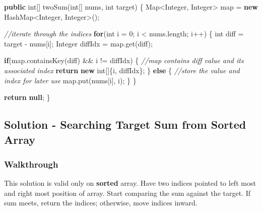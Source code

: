 \documentclass[]{book}
\newenvironment{Shaded}{\begin{snugshade}}{\end{snugshade}}
\newcommand{\BuiltInTok}[1]{#1}
\newcommand{\CommentTok}[1]{\textcolor[rgb]{0.56,0.35,0.01}{\textit{#1}}}
\newcommand{\DataTypeTok}[1]{\textcolor[rgb]{0.13,0.29,0.53}{#1}}
\newcommand{\DecValTok}[1]{\textcolor[rgb]{0.00,0.00,0.81}{#1}}
\newcommand{\FunctionTok}[1]{\textcolor[rgb]{0.00,0.00,0.00}{#1}}
\newcommand{\KeywordTok}[1]{\textcolor[rgb]{0.13,0.29,0.53}{\textbf{#1}}}
\newcommand{\NormalTok}[1]{#1}
\begin{document}
\begin{Shaded}
\begin{Highlighting}[]
\KeywordTok{public} \DataTypeTok{int}\NormalTok{[] }\FunctionTok{twoSum}\NormalTok{(}\DataTypeTok{int}\NormalTok{[] nums, }\DataTypeTok{int}\NormalTok{ target) \{}
    \BuiltInTok{Map}\NormalTok{<}\BuiltInTok{Integer}\NormalTok{, }\BuiltInTok{Integer}\NormalTok{> map = }\KeywordTok{new} \BuiltInTok{HashMap}\NormalTok{<}\BuiltInTok{Integer}\NormalTok{, }\BuiltInTok{Integer}\NormalTok{>();}

    \CommentTok{//iterate through the indices}
    \KeywordTok{for}\NormalTok{(}\DataTypeTok{int}\NormalTok{ i = }\DecValTok{0}\NormalTok{; i < nums.}\FunctionTok{length}\NormalTok{; i++) \{}
        \DataTypeTok{int}\NormalTok{ diff = target - nums[i];}
        \BuiltInTok{Integer}\NormalTok{ diffIdx = map.}\FunctionTok{get}\NormalTok{(diff);}

        \KeywordTok{if}\NormalTok{(map.}\FunctionTok{containsKey}\NormalTok{(diff) && i != diffIdx) \{}
            \CommentTok{//map contains diff value and its associated index}
            \KeywordTok{return} \KeywordTok{new} \DataTypeTok{int}\NormalTok{[]\{i, diffIdx\};}
\NormalTok{        \} }\KeywordTok{else}\NormalTok{ \{}
            \CommentTok{//store the value and index for later use}
\NormalTok{            map.}\FunctionTok{put}\NormalTok{(nums[i], i);}
\NormalTok{        \}}
\NormalTok{    \}}

    \KeywordTok{return} \KeywordTok{null}\NormalTok{;}
\NormalTok{\}}
\end{Highlighting}
\end{Shaded}

\hypertarget{solution---searching-target-sum-from-sorted-array}{%
\subsection{Solution - Searching Target Sum from Sorted Array}\label{solution---searching-target-sum-from-sorted-array}}

\hypertarget{walkthrough-1}{%
\subsubsection{Walkthrough}\label{walkthrough-1}}

This solution is valid only on \textbf{sorted} array. Have two indices pointed to left most and right most position
of array. Start comparing the sum against the target. If sum meets, return the indices; otherwise, move indices
inward.
\end{document}
